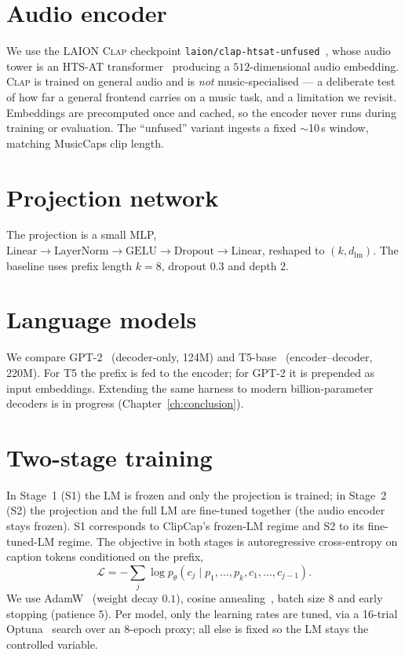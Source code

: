 \documentclass[9pt]{report}
\newcommand{\clapenc}{\textsc{Clap}}
\begin{document}
\section{Audio encoder}
We use the LAION \clapenc{} checkpoint \texttt{laion/clap-htsat-unfused}~\cite{wu2023clap},
whose audio tower is an HTS-AT transformer~\cite{chen2022htsat} producing a $512$-dimensional
audio embedding. \clapenc{} is trained on general audio and is \emph{not}
music-specialised --- a deliberate test of how far a general frontend carries on a music task,
and a limitation we revisit. Embeddings are precomputed once and cached, so the encoder never
runs during training or evaluation. The ``unfused'' variant ingests a fixed $\sim$10\,s window,
matching MusicCaps clip length.

\section{Projection network}
The projection is a small MLP,
$\text{Linear}\!\rightarrow\!\text{LayerNorm}\!\rightarrow\!\text{GELU}\!\rightarrow\!
\text{Dropout}\!\rightarrow\!\text{Linear}$, reshaped to $(k,d_{\text{lm}})$. The baseline uses
prefix length $k{=}8$, dropout $0.3$ and depth $2$.

\section{Language models}
We compare GPT-2~\cite{radford2019gpt2} (decoder-only, 124M) and T5-base~\cite{raffel2020t5}
(encoder--decoder, 220M). For T5 the prefix is fed to the encoder; for GPT-2 it is prepended as
input embeddings. Extending the same harness to modern billion-parameter decoders is in progress
(Chapter~\ref{ch:conclusion}).

\section{Two-stage training}
In Stage~1 (S1) the LM is frozen and only the projection is trained; in Stage~2 (S2) the
projection and the full LM are fine-tuned together (the audio encoder stays frozen). S1
corresponds to ClipCap's frozen-LM regime and S2 to its fine-tuned-LM regime. The objective in
both stages is autoregressive cross-entropy on caption tokens conditioned on the prefix,
\[
  \mathcal{L} = -\sum_{j}\log p_\theta\!\left(c_j \mid p_1,\dots,p_k, c_1,\dots,c_{j-1}\right).
\]
We use AdamW~\cite{loshchilov2019adamw} (weight decay $0.1$), cosine
annealing~\cite{loshchilov2017sgdr}, batch size $8$ and early stopping
(patience $5$). Per model, only the learning rates are tuned, via a 16-trial
Optuna~\cite{akiba2019optuna} search over an 8-epoch proxy; all else is fixed so the LM stays
the controlled variable.
\end{document}
